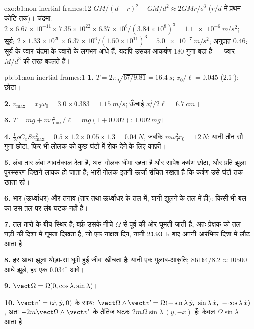 \begin{solution}{exo:b1:non-inertial-frames:12}
$GM/(d - r)^2 - GM/d^2 \approx 2GMr/d^3$ ($r/d$ में प्रथम कोटि तक)। चंद्रमा:
$2 \times 6.67\times10^{-11} \times 7.35\times10^{22} \times 6.37\times10^6/
(3.84\times10^8)^3 = \qty{1.1e-6}{m/s^2}$; सूर्य: $2 \times 1.33\times10^{20}
\times 6.37\times10^6/(1.50\times10^{11})^3 = \qty{5.0e-7}{m/s^2}$; अनुपात
$0.46$: सूर्य के ज्वार चंद्रमा के ज्वारों के लगभग आधे हैं, यद्यपि उसका
आकर्षण $180$ गुना बड़ा है --- ज्वार $M/d^3$ की तरह बदलते हैं।
\end{solution}

\begin{solution}{pb:b1:non-inertial-frames:1}
\textbf{1.} $T = 2\pi\sqrt{67/9.81} = \qty{16.4}{s}$; $x_0/\ell = 0.045$
($2.6^\circ$): छोटा।

\textbf{2.} $v_{\max} = x_0\omega_0 = 3.0 \times 0.383 = \qty{1.15}{m/s}$; ऊँचाई
$x_0^2/2\ell = \qty{6.7}{cm}$।

\textbf{3.} $T = mg + mv_{\max}^2/\ell = mg(1 + 0.002)$: $1.002\,mg$।

\textbf{4.} $\tfrac12\rho C_xSv_{\max}^2 = 0.5 \times 1.2 \times 0.05 \times 1.3 =
\qty{0.04}{N}$, जबकि $m\omega_0^2x_0 = \qty{12}{N}$: यानी तीन सौ गुना
छोटा, फिर भी लोलक को कुछ घंटों में रोक देने के लिए काफ़ी।

\textbf{5.} लंबा तार लंबा आवर्तकाल देता है, अतः गोलक धीमा रहता है और
सापेक्ष कर्षण छोटा, और प्रति झूला पुरस्सरण दिखने लायक हो जाता है; भारी
गोलक इतनी ऊर्जा संचित रखता है कि कर्षण उसे घंटों तक खाता रहे।

\textbf{6.} भार (ऊर्ध्वाधर) और तनाव (तार तथा ऊर्ध्वाधर के तल में, यानी
झूलने के तल में ही): किसी भी बल का उस तल पर लंब घटक नहीं है।

\textbf{7.} तल तारों के बीच स्थिर है; बर्फ़ उसके नीचे $\Omega$ से पूर्व की
ओर घूमती जाती है, अतः प्रेक्षक को तल घड़ी की दिशा में घूमता दिखता है, जो
एक नाक्षत्र दिन, यानी \qty{23.93}{h} बाद अपनी आरंभिक दिशा में लौट आता है।

\textbf{8.} हर आधा झूला थोड़ा-सा घूमी हुई जीवा खींचता है: यानी एक
गुलाब-आकृति; $86164/8.2 \approx 10500$ आधे झूले, हर एक $0.034^\circ$ आगे।

\textbf{9.} $\vect\Omega = \Omega(0, \cos\lambda, \sin\lambda)$।

\textbf{10.} $\vect v' = (\dot x, \dot y, 0)$ के साथ:
$\vect\Omega\wedge\vect v' = \Omega(-\sin\lambda\,\dot y,\ \sin\lambda\,\dot x,\ -\cos\lambda\,\dot x)$,
अतः $-2m\vect\Omega\wedge\vect v'$ के क्षैतिज घटक
$2m\Omega\sin\lambda\,(\dot y, -\dot x)$ हैं: केवल $\Omega\sin\lambda$ आता है।


\end{solution}
